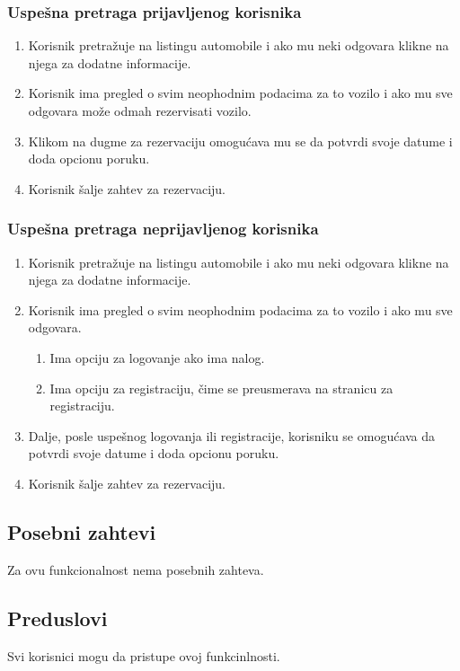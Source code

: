 \documentclass[12pt]{article}
\begin{document}
\subsubsection{Uspešna pretraga prijavljenog korisnika}
\begin{enumerate}
   \item Korisnik pretražuje na listingu automobile i ako mu neki odgovara klikne na njega za dodatne informacije.
   \item Korisnik ima pregled o svim neophodnim podacima za to vozilo i ako mu sve odgovara može odmah rezervisati vozilo.
   \item Klikom na dugme za rezervaciju omogućava mu se da potvrdi svoje datume i doda opcionu poruku.
   \item Korisnik šalje zahtev za rezervaciju.
 \end{enumerate}
 
 \subsubsection{Uspešna pretraga neprijavljenog korisnika}
\begin{enumerate}
   \item Korisnik pretražuje na listingu automobile i ako mu neki odgovara klikne na njega za dodatne informacije.
   \item Korisnik ima pregled o svim neophodnim podacima za to vozilo i ako mu sve odgovara.
   \begin{enumerate}
   \item Ima opciju za logovanje ako ima nalog.
   \item Ima opciju za registraciju, čime se preusmerava na stranicu za registraciju.
   \end{enumerate}
   \item Dalje, posle uspešnog logovanja ili registracije, korisniku se omogućava da potvrdi svoje datume i doda opcionu poruku.
   \item Korisnik šalje zahtev za rezervaciju.
 \end{enumerate}
 
 
\subsection{Posebni zahtevi}
Za ovu funkcionalnost nema posebnih zahteva.
\subsection{Preduslovi}
Svi korisnici mogu da pristupe ovoj funkcinlnosti.
\end{document}
